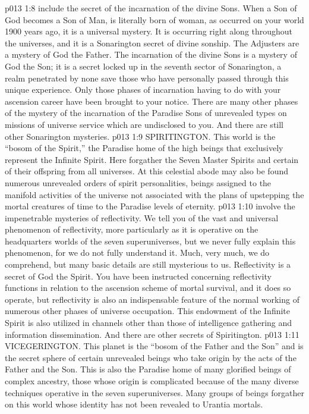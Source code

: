 \vs p013 1:8 \pc {} include the secret of the incarnation of the divine Sons. When a Son of God becomes a Son of Man, is literally born of woman, as occurred on your world 1900 years ago, it is a universal mystery. It is occurring right along throughout the universes, and it is a Sonarington secret of divine sonship. The Adjusters are a mystery of God the Father. The incarnation of the divine Sons is a mystery of God the Son; it is a secret locked up in the seventh sector of Sonarington, a realm penetrated by none save those who have personally passed through this unique experience. Only those phases of incarnation having to do with your ascension career have been brought to your notice. There are many other phases of the mystery of the incarnation of the Paradise Sons of unrevealed types on missions of universe service which are undisclosed to you. And there are still other Sonarington mysteries.
\vs p013 1:9 \bibnobreakspace SPIRITINGTON. This world is the “bosom of the Spirit,” the Paradise home of the high beings that exclusively represent the Infinite Spirit. Here forgather the Seven Master Spirits and certain of their offspring from all universes. At this celestial abode may also be found numerous unrevealed orders of spirit personalities, beings assigned to the manifold activities of the universe not associated with the plans of upstepping the mortal creatures of time to the Paradise levels of eternity.
\vs p013 1:10 \pc {} involve the impenetrable mysteries of reflectivity. We tell you of the vast and universal phenomenon of reflectivity, more particularly as it is operative on the headquarters worlds of the seven superuniverses, but we never fully explain this phenomenon, for we do not fully understand it. Much, very much, we do comprehend, but many basic details are still mysterious to us. Reflectivity is a secret of God the Spirit. You have been instructed concerning reflectivity functions in relation to the ascension scheme of mortal survival, and it does so operate, but reflectivity is also an indispensable feature of the normal working of numerous other phases of universe occupation. This endowment of the Infinite Spirit is also utilized in channels other than those of intelligence gathering and information dissemination. And there are other secrets of Spiritington.
\vs p013 1:11 \bibnobreakspace VICEGERINGTON. This planet is the “bosom of the Father and the Son” and is the secret sphere of certain unrevealed beings who take origin by the acts of the Father and the Son. This is also the Paradise home of many glorified beings of complex ancestry, those whose origin is complicated because of the many diverse techniques operative in the seven superuniverses. Many groups of beings forgather on this world whose identity has not been revealed to Urantia mortals.
